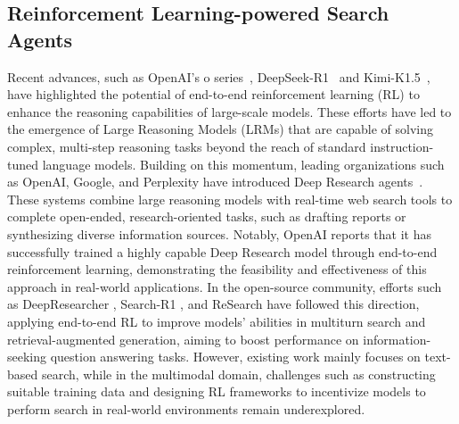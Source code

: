 \documentclass{article}
\begin{document}
\subsection{Reinforcement Learning-powered Search Agents}
Recent advances, such as OpenAI's o series~\cite{rl/openai-o1,openai-o3_o4_mini_syscard}, DeepSeek-R1~\cite{rl/deepseek-r1} and Kimi-K1.5~\cite{rl/kimi-k1.5}, have highlighted the potential of end-to-end reinforcement learning (RL) to enhance the reasoning capabilities of large-scale models. These efforts have led to the emergence of Large Reasoning Models (LRMs) that are capable of solving complex, multi-step reasoning tasks beyond the reach of standard instruction-tuned language models. Building on this momentum, leading organizations such as OpenAI, Google, and Perplexity have introduced Deep Research agents~\cite{openai-deep-research,claude-deep-research,gemini-deep-research,perplexity-deep-research}. These systems combine large reasoning models with real-time web search tools to complete open-ended, research-oriented tasks, such as drafting reports or synthesizing diverse information sources. Notably, OpenAI reports that it has successfully trained a highly capable Deep Research model through end-to-end reinforcement learning, demonstrating the feasibility and effectiveness of this approach in real-world applications. In the open-source community, efforts such as DeepResearcher \cite{text-search/deepresearcher}, Search-R1 \cite{text-search/search-r1}, and ReSearch \cite{text-search/ReSearch} have followed this direction, applying end-to-end RL to improve models’ abilities in multiturn search and retrieval-augmented generation, aiming to boost performance on information-seeking question answering tasks. However, existing work mainly focuses on text-based search, while in the multimodal domain, challenges such as constructing suitable training data and designing RL frameworks to incentivize models to perform search in real-world environments remain underexplored.
\end{document}
